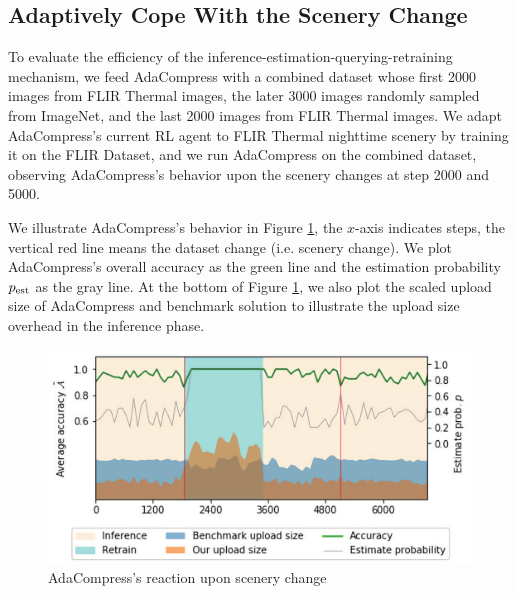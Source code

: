 \subsection{Adaptively Cope With the Scenery Change}

To evaluate the efficiency of the inference-estimation-querying-retraining mechanism, we feed AdaCompress with a combined dataset whose first 2000 images from FLIR Thermal images, the later 3000 images randomly sampled from ImageNet, and the last 2000 images from FLIR Thermal images. We adapt AdaCompress's current RL agent to FLIR Thermal nighttime scenery by training it on the FLIR Dataset, and we run AdaCompress on the combined dataset, observing AdaCompress's behavior upon the scenery changes at step 2000 and 5000. %

We illustrate AdaCompress's behavior in Figure \ref{fig: running-retrain}, the $ x $-axis indicates steps, the vertical red line means the dataset change (i.e. scenery change). We plot AdaCompress's overall accuracy as the green line and the estimation probability $ p_{\rm est} $ as the gray line. At the bottom of Figure \ref{fig: running-retrain}, we also plot the scaled upload size of AdaCompress and benchmark solution to illustrate the upload size overhead in the inference phase.


\begin{figure}[htbp]
    \includegraphics[width=\linewidth]{figures/running-retrain.pdf}
    \caption{AdaCompress's reaction upon scenery change}
    \label{fig: running-retrain}
\end{figure}

